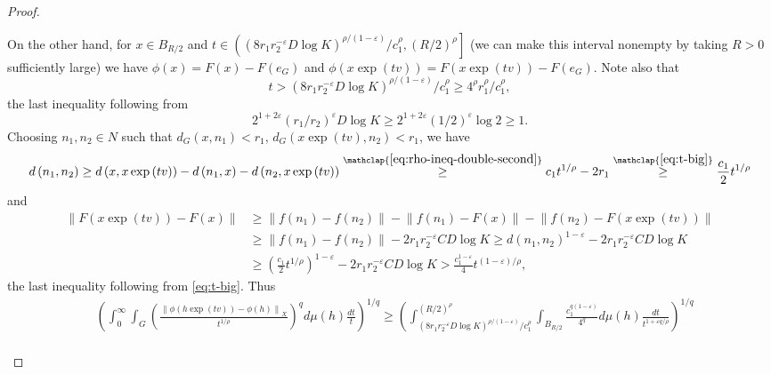 \documentclass[11pt,reqno]{amsart}
\newcommand{\1}{\mathbf 1}
\begin{document}
\begin{proof}
\begin{enumerate}
On the other hand, for $x\in B_{R/2}$ and $t\in \left(\left(8r_1r_2^{-\varepsilon}D\log K\right)^{\rho/\left(1-\varepsilon\right)}/c_1^\rho,\left(R/2\right)^\rho\right]$ (we can make this interval nonempty by taking $R>0$ sufficiently large) we have $\phi\left(x\right)=F\left(x\right)-F\left(e_G\right)$ and $\phi\left(x\exp\left(tv\right)\right)=F\left(x\exp\left(tv\right)\right)-F\left(e_G\right)$. Note also that
\begin{equation}\label{eq:t-big}
t> \left(8r_1r_2^{-\varepsilon}D\log K\right)^{\rho/\left(1-\varepsilon\right)}/c_1^\rho\ge 4^\rho r_1^\rho / c_1^\rho,
\end{equation}
the last inequality following from
\[
2^{1+2\varepsilon}\left(r_1/r_2\right)^{\varepsilon}D\log K\ge 2^{1+2\varepsilon}\left(1/2\right)^{\varepsilon}\log 2\ge  1.
\]
 Choosing $n_1,n_2\in N$ such that $d_G\left(x,n_1\right)<r_1$, $d_G\left(x\exp\left(tv\right),n_2\right)<r_1$, we have
\begin{equation}
d\left(n_1,n_2\right)\ge d\left(x,x\exp\left(tv\right)\right)-d\left(n_1,x\right)-d\left(n_2,x\exp\left(tv\right)\right)\stackrel{\mathclap{\eqref{eq:rho-ineq-double-second}}}{\ge} c_1t^{1/\rho}-2r_1\stackrel{\mathclap{\eqref{eq:t-big}}}{\ge} \frac{c_1}{2}t^{1/\rho}
\end{equation}
and
\begin{align*}
\left\|F\left(x\exp\left(tv\right)\right)-F\left(x\right)\right\|&\ge \left\|f\left(n_1\right)-f\left(n_2\right)\right\|-\left\|f\left(n_1\right)-F\left(x\right)\right\|-\left\|f\left(n_2\right)-F\left(x\exp\left(tv\right)\right)\right\|\\
&\ge \left\|f\left(n_1\right)-f\left(n_2\right)\right\|-2r_1r_2^{-\varepsilon}CD\log K\ge d\left(n_1,n_2\right)^{1-\varepsilon}-2r_1r_2^{-\varepsilon}CD\log K\\
&\ge \left(\frac{c_1}{2}t^{1/\rho}\right)^{1-\varepsilon}-2r_1r_2^{-\varepsilon}CD\log K>\frac {c_1^{1-\varepsilon}}4 t^{\left(1-\varepsilon\right)/\rho},
\end{align*}
the last inequality following from \eqref{eq:t-big}.
Thus
\begin{align*}
&\left(\int_0^\infty \int_{G}\left(\frac{\left\|\phi\left(h\exp\left(tv\right)\right)-\phi\left(h\right)\right\|_X}{t^{1/\rho}}\right)^qd\mu\left(h\right)\frac{dt}{t}\right)^{1/q} \ge \left(\int_{\left(8r_1r_2^{-\varepsilon}D\log K\right)^{\rho/\left(1-\varepsilon\right)}/c_1^\rho}^{\left(R/2\right)^\rho}\int_{B_{R/2}} \frac{c_1^{q\left(1-\varepsilon\right)}}{4^q}d\mu\left(h\right) \frac{dt}{t^{1+\varepsilon q/\rho}}\right)^{1/q}\\

\end{align*}
\end{enumerate}
\end{proof}
\end{document}
